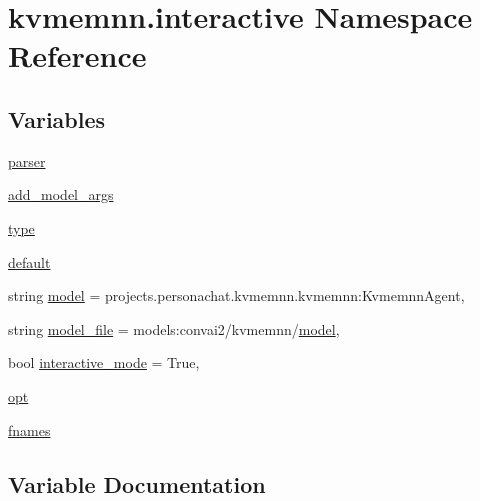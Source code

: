\hypertarget{namespacekvmemnn_1_1interactive}{}\section{kvmemnn.\+interactive Namespace Reference}
\label{namespacekvmemnn_1_1interactive}
\subsection*{Variables}
\begin{DoxyCompactItemize}
\item 
\hyperlink{namespacekvmemnn_1_1interactive_a41ec9f716f2080d80444749f7b969728}{parser}
\item 
\hyperlink{namespacekvmemnn_1_1interactive_a01daf0f3da5f90af0ddfd1307850b28a}{add\+\_\+model\+\_\+args}
\item 
\hyperlink{namespacekvmemnn_1_1interactive_a1698554012c0b91bef3ece564e11f393}{type}
\item 
\hyperlink{namespacekvmemnn_1_1interactive_a44460dfb8b38df44b326bed453a8863b}{default}
\item 
string \hyperlink{namespacekvmemnn_1_1interactive_ab9d849f42c9dc80add1b29544632509d}{model} = \textquotesingle{}projects.\+personachat.\+kvmemnn.\+kvmemnn\+:\+Kvmemnn\+Agent\textquotesingle{},
\item 
string \hyperlink{namespacekvmemnn_1_1interactive_a80e00de932e397d20d6c101c01a46ba3}{model\+\_\+file} = \textquotesingle{}models\+:convai2/kvmemnn/\hyperlink{namespacekvmemnn_1_1interactive_ab9d849f42c9dc80add1b29544632509d}{model}\textquotesingle{},
\item 
bool \hyperlink{namespacekvmemnn_1_1interactive_a05fc805a11810413f61eedf5b00e9bf7}{interactive\+\_\+mode} = True,
\item 
\hyperlink{namespacekvmemnn_1_1interactive_a70f6d84eb79dac9243d23588351c6351}{opt}
\item 
\hyperlink{namespacekvmemnn_1_1interactive_ac625e954383b5ad1ccc81c5d36f5589b}{fnames}
\end{DoxyCompactItemize}


\subsection{Variable Documentation}
\mbox{\label{namespacekvmemnn_1_1interactive_a01daf0f3da5f90af0ddfd1307850b28a}} 
